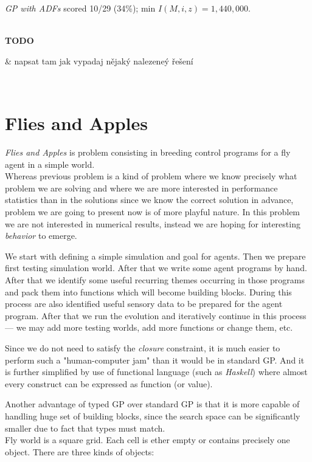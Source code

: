\documentclass[12pt,a4paper]{report}
\newenvironment{todo}
{ ~\\[0.5em]
  {\color{red}\textbf{TODO}}
  \begin{easylist}[itemize]}
{ \end{easylist}
  ~}
\begin{document}
\textit{GP with ADFs} scored 10/29 (34\%); 
min $I(M,i,z) = 1,440,000$.




\begin{todo}
& napsat tam jak vypadaj nějaký nalezeneý řešení
\end{todo} 

\section{Flies and Apples}

\textit{Flies and Apples} is problem consisting in breeding 
control programs for a fly agent in a simple world.\\ 

Whereas previous problem is a kind of problem where we know precisely
what problem we are solving and where we are more interested in 
performance statistics than in the solutions since we know the correct solution in 
advance, problem we are going to present now is of more playful nature.
In this problem we are not interested in numerical results, instead 
we are hoping for interesting \textit{behavior} to emerge.

We start with defining a simple simulation and goal for agents.
Then we prepare first testing simulation world. 
After that we write some agent programs by hand. After that we 
identify some useful recurring 
themes occurring in those programs and pack them into functions
which will become building blocks. During this process are also identified
useful sensory data to be prepared for the agent program.
After that we run the evolution and
iteratively continue in this process  --- we may add more testing worlds,
add more functions or change them, etc.
      
Since we do not need to satisfy the \textit{closure} constraint, 
it is much easier to perform such a "human-computer jam" than it
would be in standard GP. And it is further simplified by use of
functional language (such as \textit{Haskell}) where almost
every construct can be expressed as function (or value).

Another advantage of typed GP over standard GP is that 
it is more capable of handling huge set of building blocks,
since the search space can be significantly smaller due to 
fact that types must match.
\\



Fly world is a square grid. 
Each cell is ether empty or contains precisely one object.
There are three kinds of objects:
\end{document}
